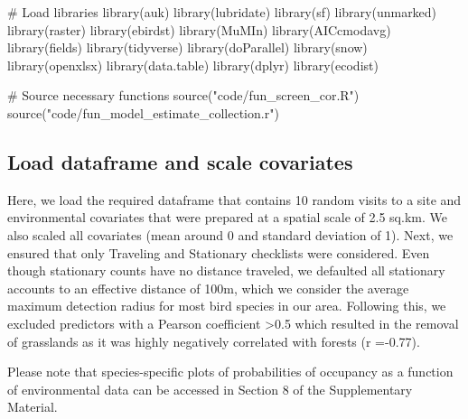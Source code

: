 \documentclass[]{article}
\newenvironment{Shaded}{}{}
\newcommand{\CommentTok}[1]{\textcolor[rgb]{0.00,0.50,0.00}{#1}}
\newcommand{\KeywordTok}[1]{\textcolor[rgb]{0.00,0.00,1.00}{#1}}
\newcommand{\NormalTok}[1]{#1}
\newcommand{\StringTok}[1]{\textcolor[rgb]{0.00,0.50,0.50}{#1}}
\begin{document}
\begin{Shaded}
\begin{Highlighting}[numbers=left,,]
\CommentTok{# Load libraries}
\KeywordTok{library}\NormalTok{(auk)}
\KeywordTok{library}\NormalTok{(lubridate)}
\KeywordTok{library}\NormalTok{(sf)}
\KeywordTok{library}\NormalTok{(unmarked)}
\KeywordTok{library}\NormalTok{(raster)}
\KeywordTok{library}\NormalTok{(ebirdst)}
\KeywordTok{library}\NormalTok{(MuMIn)}
\KeywordTok{library}\NormalTok{(AICcmodavg)}
\KeywordTok{library}\NormalTok{(fields)}
\KeywordTok{library}\NormalTok{(tidyverse)}
\KeywordTok{library}\NormalTok{(doParallel)}
\KeywordTok{library}\NormalTok{(snow)}
\KeywordTok{library}\NormalTok{(openxlsx)}
\KeywordTok{library}\NormalTok{(data.table)}
\KeywordTok{library}\NormalTok{(dplyr)}
\KeywordTok{library}\NormalTok{(ecodist)}

\CommentTok{# Source necessary functions}
\KeywordTok{source}\NormalTok{(}\StringTok{"code/fun_screen_cor.R"}\NormalTok{)}
\KeywordTok{source}\NormalTok{(}\StringTok{"code/fun_model_estimate_collection.r"}\NormalTok{)}
\end{Highlighting}
\end{Shaded}

\hypertarget{load-dataframe-and-scale-covariates}{%
\subsection{Load dataframe and scale covariates}\label{load-dataframe-and-scale-covariates}}

Here, we load the required dataframe that contains 10 random visits to a site and environmental covariates that were prepared at a spatial scale of 2.5 sq.km. We also scaled all covariates (mean around 0 and standard deviation of 1). Next, we ensured that only Traveling and Stationary checklists were considered. Even though stationary counts have no distance traveled, we defaulted all stationary accounts to an effective distance of 100m, which we consider the average maximum detection radius for most bird species in our area. Following this, we excluded predictors with a Pearson coefficient \textgreater{}0.5 which resulted in the removal of grasslands as it was highly negatively correlated with forests (r =-0.77).

Please note that species-specific plots of probabilities of occupancy as a function of environmental data can be accessed in Section 8 of the Supplementary Material.
\end{document}

